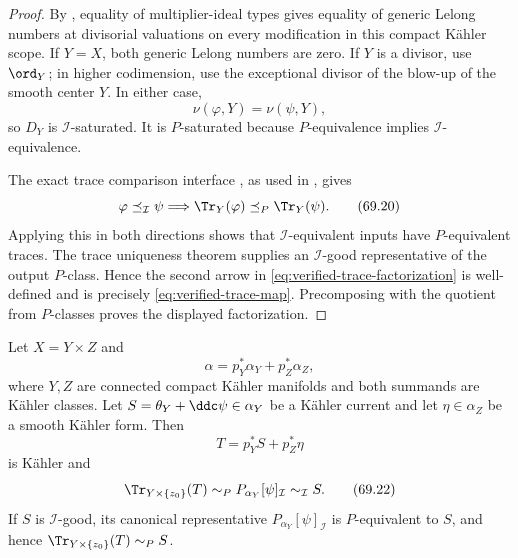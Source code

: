 \begin{proof}
By , equality of multiplier-ideal
types gives equality of generic Lelong numbers at divisorial valuations on
every modification in this compact K\"ahler scope. If $Y=X$, both generic
Lelong numbers are zero. If $Y$ is a divisor, use
$\ord_Y$; in higher codimension, use the exceptional divisor of the
blow-up of the smooth center $Y$. In either case,
\[
                       \nu(\varphi,Y)=\nu(\psi,Y),
\tag{69.19}\label{eq:verified-trace-domain-saturation}
\]
so $D_Y$ is $\mathcal I$-saturated. It is $P$-saturated because
$P$-equivalence implies $\mathcal I$-equivalence.

The exact trace comparison interface
\cite[Propositions~8.1.1--8.1.2 and~8.2.1]{XiaBook}, as used in
, gives
\[
 \varphi\preceq_{\mathcal I}\psi
       \Longrightarrow
 \Tr_Y(\varphi)\preceq_P\Tr_Y(\psi).
\tag{69.20}\label{eq:verified-trace-comparison}
\]
Applying this in both directions shows that
$\mathcal I$-equivalent inputs have $P$-equivalent traces.  The
trace uniqueness theorem supplies an $\mathcal I$-good representative
of the output $P$-class. Hence
the second arrow in \eqref{eq:verified-trace-factorization} is
well-defined and is precisely \eqref{eq:verified-trace-map}. Precomposing
with the quotient from $P$-classes proves the displayed factorization.
\end{proof}

\begin{theorem}\label{thm:verified-split-trace}
Let $X=Y\times Z$ and
\[
                 \alpha=p_Y^*\alpha_Y+p_Z^*\alpha_Z,
\]
where $Y,Z$ are connected compact K\"ahler manifolds and both summands
are K\"ahler classes. Let
$S=\theta_Y+\ddc\psi\in\alpha_Y$ be a K\"ahler current and let
$\eta\in\alpha_Z$ be a smooth K\"ahler form. Then
\[
                         T=p_Y^*S+p_Z^*\eta
\tag{69.21}\label{eq:verified-split-current}
\]
is K\"ahler and
\[
 \Tr_{Y\times\{z_0\}}(T)
       \sim_P P_{\alpha_Y}[\psi]_{\mathcal I}
       \sim_{\mathcal I}S.
\tag{69.22}\label{eq:verified-split-trace}
\]
If $S$ is $\mathcal I$-good, its canonical representative
$P_{\alpha_Y}[\psi]_{\mathcal I}$ is $P$-equivalent to $S$, and
hence $\Tr_{Y\times\{z_0\}}(T)\sim_P S$.
\end{theorem}


